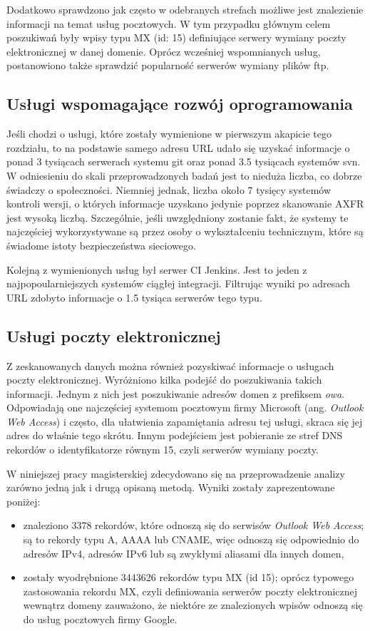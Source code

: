 Dodatkowo sprawdzono jak często w odebranych strefach możliwe jest znalezienie informacji na temat usług pocztowych. W tym przypadku
głównym celem poszukiwań były wpisy typu MX (id: 15) definiujące serwery wymiany poczty elektronicznej w danej domenie. Oprócz
wcześniej wspomnianych usług, postanowiono także sprawdzić popularność serwerów wymiany plików ftp.

\subsection{Usługi wspomagające rozwój oprogramowania}
Jeśli chodzi o usługi, które zostały wymienione w pierwszym akapicie tego rozdziału, to na podstawie samego adresu URL udało się
uzyskać informacje o ponad 3 tysiącach serwerach systemu git oraz ponad 3.5 tysiącach systemów svn. W odniesieniu do skali
przeprowadzonych badań jest to nieduża liczba, co dobrze świadczy o społeczności. Niemniej jednak, liczba około 7 tysięcy systemów
kontroli wersji, o których informacje uzyskano jedynie poprzez skanowanie AXFR jest wysoką liczbą. Szczególnie, jeśli uwzględniony
zostanie fakt, że systemy te najczęściej wykorzystywane są przez osoby o wykształceniu technicznym, które są świadome istoty
bezpieczeństwa sieciowego.

Kolejną z wymienionych usług był serwer CI Jenkins. Jest to jeden z najpopoularniejszych systemów ciągłej integracji. Filtrując
wyniki po adresach URL zdobyto informacje o 1.5 tysiąca serwerów tego typu.

\subsection{Usługi poczty elektronicznej}
Z zeskanowanych danych można również pozyskiwać informacje o usługach poczty elektronicznej. Wyróżniono kilka podejść do
poszukiwania takich informacji. Jednym z nich jest poszukiwanie adresów domen z prefiksem \textit{owa}.
Odpowiadają one najczęściej systemom pocztowym firmy Microsoft (ang. \textit{Outlook Web Access}) i często, dla ułatwienia
zapamiętania adresu tej usługi, skraca się jej adres do właśnie tego skrótu. Innym podejściem jest pobieranie ze stref DNS rekordów
o identyfikatorze równym 15, czyli serwerów wymiany poczty.

W niniejszej pracy magisterskiej zdecydowano się na przeprowadzenie analizy zarówno jedną jak i drugą opisaną metodą. Wyniki zostały
zaprezentowane poniżej:
\begin{itemize}
		\item znaleziono 3378 rekordów, które odnoszą się do serwisów \textit{Outlook Web Access}; są to rekordy typu A, AAAA lub
		CNAME, więc odnoszą się odpowiednio do adresów IPv4, adresów IPv6 lub są zwykłymi aliasami dla innych domen,
		\item zostały wyodrębnione 3443626 rekordów typu MX (id 15); oprócz typowego zastosowania rekordu MX, czyli definiowania
		serwerów poczty elektronicznej wewnątrz domeny zauważono, że niektóre ze znalezionych wpisów odnoszą się do usług pocztowych
		firmy Google.
\end{itemize}

